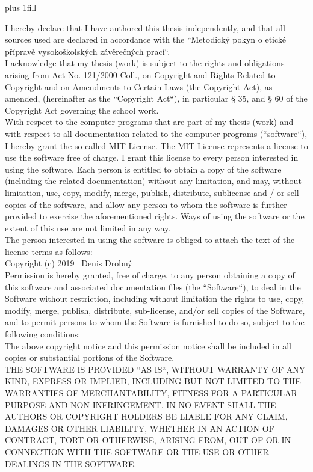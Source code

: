 \openright
\hypersetup{pageanchor=true}
\pagestyle{plain}
\vglue 0pt plus 1fill


\noindent

\medskip\noindent
I hereby declare that I have authored this thesis independently, and that all sources used are declared in accordance with the ``Metodický pokyn o etické přípravě vysokoškolských závěrečných prací``. \\

I acknowledge that my thesis (work) is subject to the rights and obligations arising from Act No. 121/2000 Coll., on Copyright and Rights Related to Copyright and on Amendments to Certain Laws (the Copyright Act), as amended, (hereinafter as the ``Copyright Act``), in particular § 35, and § 60 of the Copyright Act governing the school work. \\

With respect to the computer programs that are part of my thesis (work) and with respect to all documentation related to the computer programs (``software``), I hereby grant the so-called MIT License. 
The MIT License represents a license to use the software free of charge. I grant this license to every person interested in using the software. Each person is entitled to obtain a copy of the software (including the related documentation) without any limitation, and may, without limitation, use, copy, modify, merge, publish, distribute, sublicense and / or sell copies of the software, and allow any person to whom the software is further provided to exercise the aforementioned rights. Ways of using the software or the extent of this use are not limited in any way. \\ 

The person interested in using the software is obliged to attach the text of the license terms as follows: \\

Copyright (c) 2019 \  Denis Drobný \\
Permission is hereby granted, free of charge, to any person
obtaining a copy of this software and associated documentation
files (the ``Software``), to deal in the Software without
restriction, including without limitation the rights to use,
copy, modify, merge, publish, distribute, sub-license, and/or sell
copies of the Software, and to permit persons to whom the
Software is furnished to do so, subject to the following
conditions: \\
The above copyright notice and this permission notice shall be
included in all copies or substantial portions of the Software. \\
THE SOFTWARE IS PROVIDED ``AS IS``, WITHOUT WARRANTY OF ANY KIND,
EXPRESS OR IMPLIED, INCLUDING BUT NOT LIMITED TO THE WARRANTIES
OF MERCHANTABILITY, FITNESS FOR A PARTICULAR PURPOSE AND
NON-INFRINGEMENT. IN NO EVENT SHALL THE AUTHORS OR COPYRIGHT
HOLDERS BE LIABLE FOR ANY CLAIM, DAMAGES OR OTHER LIABILITY,
WHETHER IN AN ACTION OF CONTRACT, TORT OR OTHERWISE, ARISING
FROM, OUT OF OR IN CONNECTION WITH THE SOFTWARE OR THE USE OR
OTHER DEALINGS IN THE SOFTWARE. \\

